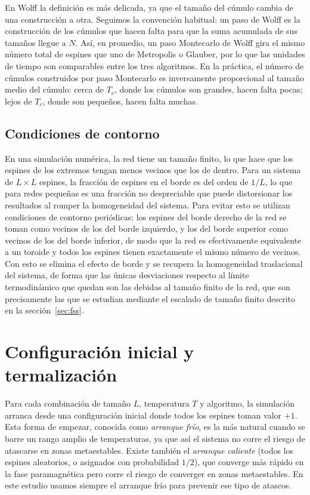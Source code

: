 En Wolff la definición es más delicada, ya que el tamaño del cúmulo cambia de una construcción a otra. Seguimos la convención habitual: un paso de Wolff es la construcción de los cúmulos que hacen falta para que la suma acumulada de sus tamaños llegue a $N$. Así, en promedio, un paso Montecarlo de Wolff gira el mismo número total de espines que uno de Metropolis o Glauber, por lo que las unidades de tiempo son comparables entre los tres algoritmos. En la práctica, el número de cúmulos construidos por paso Montecarlo es inversamente proporcional al tamaño medio del cúmulo: cerca de $T_c$, donde los cúmulos son grandes, hacen falta pocas; lejos de $T_c$, donde son pequeños, hacen falta muchas.

\subsection{Condiciones de contorno}

En una simulación numérica, la red tiene un tamaño finito, lo que hace que los espines de los extremos tengan menos vecinos que los de dentro. Para un sistema de $L\times L$ espines, la fracción de espines en el borde es del orden de $1/L$, lo que para redes pequeñas es una fracción no despreciable que puede distorsionar los resultados al romper la homogeneidad del sistema. Para evitar esto se utilizan condiciones de contorno periódicas: los espines del borde derecho de la red se toman como vecinos de los del borde izquierdo, y los del borde superior como vecinos de los del borde inferior, de modo que la red es efectivamente equivalente a un toroide y todos los espines tienen exactamente el mismo número de vecinos. Con esto se elimina el efecto de borde y se recupera la homogeneidad traslacional del sistema, de forma que las únicas desviaciones respecto al límite termodinámico que quedan son las debidas al tamaño finito de la red, que son precisamente las que se estudian mediante el escalado de tamaño finito descrito en la sección~\ref{sec:fss}.

\section{Configuración inicial y termalización}

Para cada combinación de tamaño $L$, temperatura $T$ y algoritmo, la simulación arranca desde una configuración inicial donde todos los espines toman valor $+1$. Esta forma de empezar, conocida como \textit{arranque frío}, es la más natural cuando se barre un rango amplio de temperaturas, ya que así el sistema no corre el riesgo de atascarse en zonas metaestables. Existe también el \textit{arranque caliente} (todos los espines aleatorios, o asignados con probabilidad $1/2$), que converge más rápido en la fase paramagnética pero corre el riesgo de converger en zonas metaestables. En este estudio usamos siempre el arranque frío para prevenir ese tipo de atascos.

